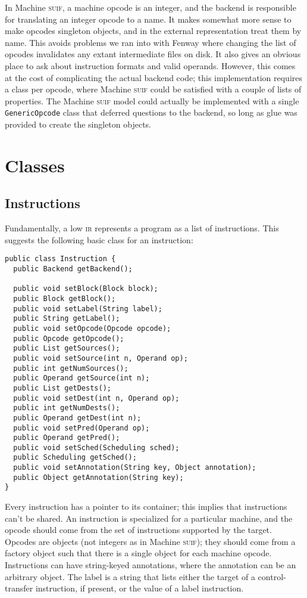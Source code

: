 \documentclass[11pt]{article}
\def\class#1{\texttt{#1}}
\def\ir{\textsc{ir}}
\def\suif{\textsc{suif}}
\def\machsuif{Machine \suif}
\begin{document}
In \machsuif{}, a machine opcode is an integer, and the backend is
responsible for translating an integer opcode to a name.  It makes
somewhat more sense to make opcodes singleton objects, and in the
external representation treat them by name.  This avoids problems we
ran into with Fenway\cite{fenway} where changing the list of opcodes
invalidates any extant intermediate files on disk.  It also gives an
obvious place to ask about instruction formats and valid operands.
However, this comes at the cost of complicating the actual backend
code; this implementation requires a class per opcode, where
\machsuif{} could be satisfied with a couple of lists of properties.
The \machsuif{} model could actually be implemented with a single
\class{Generic\-Opcode} class that deferred questions to the backend,
so long as glue was provided to create the singleton objects.

\section{Classes}

\subsection{Instructions}

Fundamentally, a low \ir{} represents a program as a list of
instructions.  This suggests the following basic class for an
instruction:

\begin{verbatim}
public class Instruction {
  public Backend getBackend();

  public void setBlock(Block block);
  public Block getBlock();
  public void setLabel(String label);
  public String getLabel();
  public void setOpcode(Opcode opcode);
  public Opcode getOpcode();
  public List getSources();
  public void setSource(int n, Operand op);
  public int getNumSources();
  public Operand getSource(int n);
  public List getDests();
  public void setDest(int n, Operand op);
  public int getNumDests();
  public Operand getDest(int n);
  public void setPred(Operand op);
  public Operand getPred();
  public void setSched(Scheduling sched);
  public Scheduling getSched();
  public void setAnnotation(String key, Object annotation);
  public Object getAnnotation(String key);
}
\end{verbatim}

Every instruction has a pointer to its container; this implies that
instructions can't be shared.  An instruction is specialized for a
particular machine, and the opcode should come from the set of
instructions supported by the target.  Opcodes are objects (not
integers as in \machsuif); they should come from a factory object such
that there is a single object for each machine opcode.  Instructions
can have string-keyed annotations, where the annotation can be an
arbitrary object.  The label is a string that lists either the target
of a control-transfer instruction, if present, or the value of a label
instruction.
\end{document}
